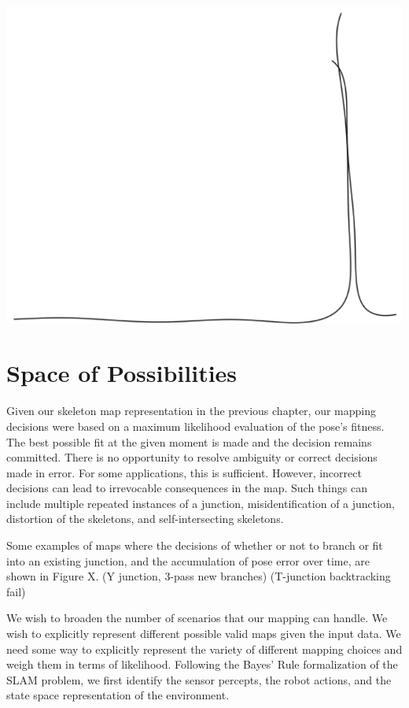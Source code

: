 \includegraphics[keepaspectratio,width=\textwidth,height=0.75\textheight]{PastedGraphic15.pdf}


\section{Space of Possibilities}
\label{spaceofpossibilities}

Given our skeleton map representation in the previous chapter, our mapping decisions were based on a maximum likelihood evaluation of the pose's fitness. The best possible fit at the given moment is made and the decision remains committed. There is no opportunity to resolve ambiguity or correct decisions made in error. For some applications, this is sufficient. However, incorrect decisions can lead to irrevocable consequences in the map. Such things can include multiple repeated instances of a junction, misidentification of a junction, distortion of the skeletons, and self-intersecting skeletons.

Some examples of maps where the decisions of whether or not to branch or fit into an existing junction, and the accumulation of pose error over time, are shown in Figure X. (Y junction, 3-pass new branches) (T-junction backtracking fail)

We wish to broaden the number of scenarios that our mapping can handle. We wish to explicitly represent different possible valid maps given the input data. We need some way to explicitly represent the variety of different mapping choices and weigh them in terms of likelihood. Following the Bayes' Rule formalization of the SLAM problem, we first identify the sensor percepts, the robot actions, and the state space representation of the environment.

